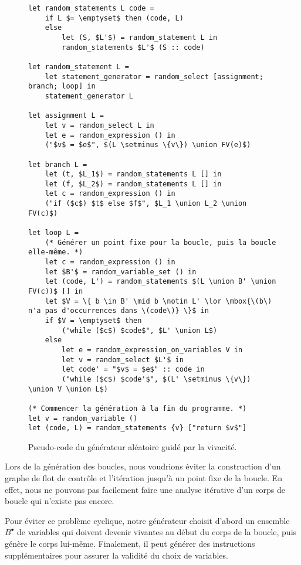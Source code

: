 \documentclass[a4paper]{easychair}
\newcommand{\livein}[1]{\ensuremath{#1^{\bullet}}}
\def\union{\cup}
\begin{document}
\begin{figure}
\begin{lstlisting}
let random_statements L code =
    if L $= \emptyset$ then (code, L)
    else
        let (S, $L'$) = random_statement L in
        random_statements $L'$ (S :: code)

let random_statement L =
    let statement_generator = random_select [assignment; branch; loop] in
    statement_generator L

let assignment L =
    let v = random_select L in
    let e = random_expression () in
    ("$v$ = $e$", $(L \setminus \{v\}) \union FV(e)$)

let branch L =
    let (t, $L_1$) = random_statements L [] in
    let (f, $L_2$) = random_statements L [] in
    let c = random_expression () in
    ("if ($c$) $t$ else $f$", $L_1 \union L_2 \union FV(c)$)

let loop L =
    (* Générer un point fixe pour la boucle, puis la boucle elle-même. *)
    let c = random_expression () in
    let $B'$ = random_variable_set () in
    let (code, L') = random_statements $(L \union B' \union FV(c))$ [] in
    let $V = \{ b \in B' \mid b \notin L' \lor \mbox{\(b\) n'a pas d'occurrences dans \(code\)} \}$ in
    if $V = \emptyset$ then
        ("while ($c$) $code$", $L' \union L$)
    else
        let e = random_expression_on_variables V in
        let v = random_select $L'$ in
        let code' = "$v$ = $e$" :: code in
        ("while ($c$) $code'$", $(L' \setminus \{v\}) \union V \union L$)

(* Commencer la génération à la fin du programme. *)
let v = random_variable ()
let (code, L) = random_statements {v} ["return $v$"]
\end{lstlisting}
\caption{Pseudo-code du générateur aléatoire guidé par la vivacité.}
\label{fig:generator}
\end{figure}

Lors de la génération des boucles, nous voudrions éviter la construction
d'un graphe de flot de contrôle et l'itération jusqu'à un point fixe de la
boucle. En effet, nous ne pouvons pas facilement faire une analyse itérative
d'un corps de boucle qui n'existe pas encore.


Pour éviter ce problème cyclique, notre générateur choisit d'abord un
ensemble~\(\livein{B}\) de variables qui doivent devenir vivantes au
début du corps de la boucle, puis génère le corps
lui-même. Finalement, il peut générer des instructions supplémentaires
pour assurer la validité du choix de variables.
\end{document}
